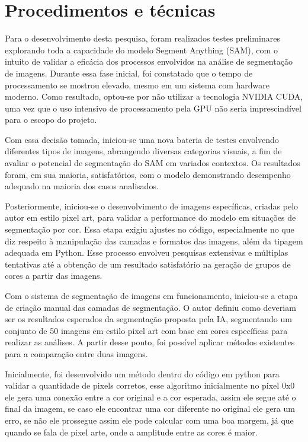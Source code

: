 \section{Procedimentos e técnicas}

Para o desenvolvimento desta pesquisa, foram realizados testes preliminares explorando toda a capacidade do modelo Segment Anything (SAM), com o intuito de validar a eficácia dos processos envolvidos na análise de segmentação de imagens. Durante essa fase inicial, foi constatado que o tempo de processamento se mostrou elevado, mesmo em um sistema com hardware moderno. Como resultado, optou-se por não utilizar a tecnologia NVIDIA CUDA, uma vez que o uso intensivo de processamento pela GPU não seria imprescindível para o escopo do projeto.

Com essa decisão tomada, iniciou-se uma nova bateria de testes envolvendo diferentes tipos de imagens, abrangendo diversas categorias visuais, a fim de avaliar o potencial de segmentação do SAM em variados contextos. Os resultados foram, em sua maioria, satisfatórios, com o modelo demonstrando desempenho adequado na maioria dos casos analisados.

Posteriormente, iniciou-se o desenvolvimento de imagens específicas, criadas pelo autor em estilo pixel art, para validar a performance do modelo em situações de segmentação por cor. Essa etapa exigiu ajustes no código, especialmente no que diz respeito à manipulação das camadas e formatos das imagens, além da tipagem adequada em Python. Esse processo envolveu pesquisas extensivas e múltiplas tentativas até a obtenção de um resultado satisfatório na geração de grupos de cores a partir das imagens.

Com o sistema de segmentação de imagens em funcionamento, iniciou-se a etapa de criação manual das camadas de segmentação. O autor definiu como deveriam ser os resultados esperados da segmentação proposta pela IA, segmentando um conjunto de 50 imagens em estilo pixel art com base em cores específicas para realizar as análises. A partir desse ponto, foi possível aplicar métodos existentes para a comparação entre duas imagens.

Inicialmente, foi desenvolvido um método dentro do código em python para validar a quantidade de pixels corretos, esse algoritmo inicialmente no pixel 0x0 ele gera uma conexão entre a cor original e a cor esperada, assim ele segue até o final da imagem, se caso ele encontrar uma cor diferente no original ele gera um erro, se não ele prossegue assim ele pode calcular com uma boa margem, já que quando se fala de pixel arte, onde a amplitude entre as cores é maior. 

